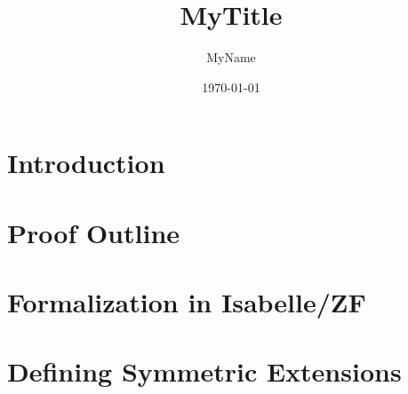 \documentclass{article}
\theoremstyle{plain}
\theoremstyle{definition}
\begin{document}
\title{MyTitle}
\author{MyName}
\date{\today}
\maketitle

\chapter{Introduction}

\chapter{Proof Outline}

\chapter{Formalization in Isabelle/ZF} 

\chapter{Defining Symmetric Extensions} 

\chapter{}
\end{document}
